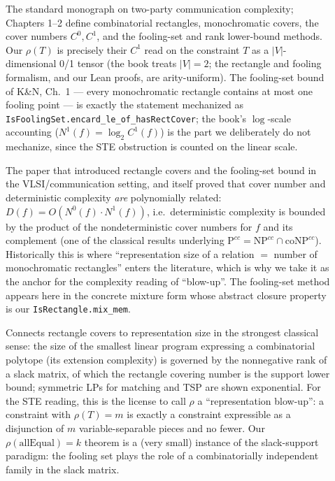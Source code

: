 \documentclass[11pt]{article}
\newcommand{\ste}[1]{\texttt{#1}}
\begin{document}
\begin{description}

\item[\citet{kushilevitz1997communication}]
The standard monograph on two-party communication complexity; Chapters
1--2 define combinatorial rectangles, monochromatic covers, the cover
numbers $C^0,C^1$, and the fooling-set and rank lower-bound methods.
Our $\rho(T)$ is precisely their $C^1$ read on the constraint $T$ as a
$|V|$-dimensional 0/1 tensor (the book treats $|V|=2$; the rectangle
and fooling formalism, and our Lean proofs, are arity-uniform). The
fooling-set bound of K\&N, Ch.~1 --- every monochromatic rectangle
contains at most one fooling point --- is exactly the statement mechanized as
\ste{IsFoolingSet.encard\_le\_of\_hasRectCover}; the book's
$\log$-scale accounting ($N^1(f)=\log_2 C^1(f)$) is the part we
deliberately do not mechanize, since the STE obstruction is counted on
the linear scale.

\item[\citet{aho1983notions}]
The paper that introduced rectangle covers and the fooling-set bound in
the VLSI/communication setting, and itself proved that cover number and
deterministic complexity \emph{are} polynomially related:
$D(f)=O(N^0(f)\cdot N^1(f))$, i.e.\ deterministic complexity is bounded
by the product of the nondeterministic cover numbers for $f$ and its
complement (one of the classical results underlying $\mathrm{P}^{cc}
=\mathrm{NP}^{cc}\cap\mathrm{coNP}^{cc}$). Historically this is where ``representation size
of a relation $=$ number of monochromatic rectangles'' enters the
literature, which is why we take it as the anchor for the complexity
reading of ``blow-up''. The fooling-set method appears here in the
concrete mixture form whose abstract closure property is our
\ste{IsRectangle.mix\_mem}.

\item[\citet{yannakakis1991expressing}]
Connects rectangle covers to representation size in the strongest
classical sense: the size of the smallest linear program expressing a
combinatorial polytope (its extension complexity) is governed by the
nonnegative rank of a slack matrix, of which the rectangle covering
number is the support lower bound; symmetric LPs for matching and TSP
are shown exponential. For the STE reading, this is the license to call
$\rho$ a ``representation blow-up'': a constraint with $\rho(T)=m$ is
exactly a constraint expressible as a disjunction of $m$
variable-separable pieces and no fewer. Our
$\rho(\mathrm{allEqual})=k$ theorem is a (very small) instance of the
slack-support paradigm: the fooling set plays the role of a
combinatorially independent family in the slack matrix.


\end{description}
\end{document}
